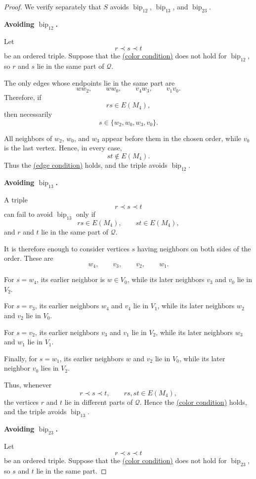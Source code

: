 \documentclass[12pt]{article}
\theoremstyle{plain}
\theoremstyle{definition}
\theoremstyle{remark}
\theoremstyle{definition}
\newcommand{\edgecondition}{%
  \hyperref[def:avoid:cond:edge]{(edge condition)}\xspace
}
\newcommand{\colorcondition}{%
  \hyperref[def:avoid:cond:color]{(color condition)}\xspace
}
\newcommand{\biplabel}{\mathrm{bip}}
\DeclareRobustCommand{\bipparam}[1]{%
  \ensuremath{\mathop{\biplabel}\nolimits_{#1}}%
}
\begin{document}
\begin{proof}
We verify separately that \(S\) avoids
\(\bipparam{12}\), \(\bipparam{13}\), and \(\bipparam{23}\).

\medskip
\noindent\textbf{Avoiding \(\bipparam{12}\).}

Let
\[
r\prec s\prec t
\]
be an ordered triple. Suppose that the \colorcondition{} does not hold for
\(\bipparam{12}\), so \(r\) and \(s\) lie in the same part of
\(\mathcal Q\).

The only edges whose endpoints lie in the same part are
\[
ww_2,\qquad
ww_0,\qquad
v_4w_3,\qquad
v_1v_0.
\]
Therefore, if
\[
rs\in E(M_4),
\]
then necessarily
\[
s\in\{w_2,w_0,w_3,v_0\}.
\]

All neighbors of \(w_2\), \(w_0\), and \(w_3\) appear before them in the
chosen order, while \(v_0\) is the last vertex. Hence, in every case,
\[
st\notin E(M_4).
\]
Thus the \edgecondition{} holds, and the triple avoids
\(\bipparam{12}\).

\medskip
\noindent\textbf{Avoiding \(\bipparam{13}\).}

A triple
\[
r\prec s\prec t
\]
can fail to avoid \(\bipparam{13}\) only if
\[
rs\in E(M_4),
\qquad
st\in E(M_4),
\]
and \(r\) and \(t\) lie in the same part of \(\mathcal Q\).

It is therefore enough to consider vertices \(s\) having neighbors on both
sides of the order. These are
\[
w_4,\qquad v_3,\qquad v_2,\qquad w_1.
\]

For \(s=w_4\), its earlier neighbor is \(w\in V_0\), while its later
neighbors \(v_3\) and \(v_0\) lie in \(V_2\).

For \(s=v_3\), its earlier neighbors \(w_4\) and \(v_4\) lie in \(V_1\),
while its later neighbors \(w_2\) and \(v_2\) lie in \(V_0\).

For \(s=v_2\), its earlier neighbors \(v_3\) and \(v_1\) lie in \(V_2\),
while its later neighbors \(w_3\) and \(w_1\) lie in \(V_1\).

Finally, for \(s=w_1\), its earlier neighbors \(w\) and \(v_2\) lie in
\(V_0\), while its later neighbor \(v_0\) lies in \(V_2\).

Thus, whenever
\[
r\prec s\prec t,
\qquad
rs,st\in E(M_4),
\]
the vertices \(r\) and \(t\) lie in different parts of \(\mathcal Q\).
Hence the \colorcondition{} holds, and the triple avoids
\(\bipparam{13}\).

\medskip
\noindent\textbf{Avoiding \(\bipparam{23}\).}

Let
\[
r\prec s\prec t
\]
be an ordered triple. Suppose that the \colorcondition{} does not hold for
\(\bipparam{23}\), so \(s\) and \(t\) lie in the same part.


\end{proof}
\end{document}

